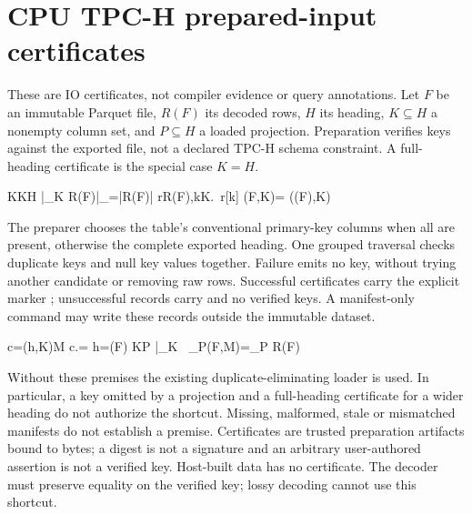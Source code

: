 \section{CPU TPC-H prepared-input certificates}

These are IO certificates, not compiler evidence or query annotations.  Let
$F$ be an immutable Parquet file, $R(F)$ its decoded rows, $H$ its heading,
$K\subseteq H$ a nonempty column set, and $P\subseteq H$ a loaded projection.
Preparation verifies keys against the exported file, not a declared TPC-H
schema constraint.  A full-heading certificate is the special case $K=H$.

{K\ne\varnothing \quad K\subseteq H \quad
 |\pi_K R(F)|_{}=|R(F)| \quad
 \forall r\in R(F),k\in K.\ r[k]\ne{}}
{(F,K)=
 ((F),K)}

The preparer chooses the table's conventional primary-key columns when all
are present, otherwise the complete exported heading. One grouped traversal
checks duplicate keys and null key values together. Failure emits no key,
without trying another candidate or removing raw rows. Successful certificates
carry the explicit marker ; unsuccessful records carry
 and no verified keys. A manifest-only command may
write these records outside the immutable dataset.

{c=(h,K)\in M \quad c.= \quad
 h=(F) \quad K\subseteq P \quad
 |_K\ }
{_P(F,M)=\pi_P R(F)\quad
 }

Without these premises the existing duplicate-eliminating loader is used.
In particular, a key omitted by a projection and a full-heading certificate
for a wider heading do not authorize the shortcut. Missing, malformed,
stale or mismatched manifests do not establish a premise.  Certificates
are trusted preparation artifacts bound to bytes; a digest is not a
signature and an arbitrary user-authored assertion is not a verified key.
Host-built data has no certificate.  The decoder must preserve equality on
the verified key; lossy decoding cannot use this shortcut.
